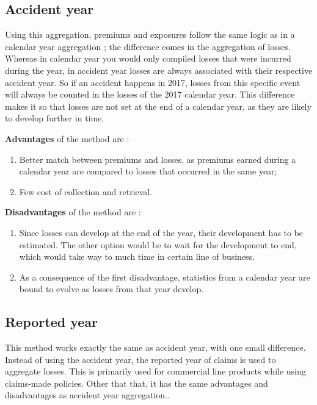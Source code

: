 \documentclass[11pt, english]{memoir}
\numberwithin{definition}{section}
\begin{document}
	\subsection{Accident year}
	Using this aggregation, premiums and exposures follow the same logic as in a calendar year aggregation ; the difference comes in the aggregation of losses. Whereas in calendar year you would only compiled losses that were incurred during the year, in accident year losses are always associated with their respective accident year. So if an accident happens in 2017, losses from this specific event will always be counted in the losses of the 2017 calendar year. This difference makes it so that losses are not set at the end of a calendar year, as they are likely to develop further in time.

	\textbf{Advantages} of the method are :
	\begin{enumerate}
		\item Better match between premiums and losses, as premiums earned during a calendar year are compared to losses that occurred in the same year;
		\item Few cost of collection and retrieval.
	\end{enumerate}

	\textbf{Disadvantages} of the method are : 
	\begin{enumerate}
		\item Since losses can develop at the end of the year, their development has to be estimated. The other option would be to wait for the development to end, which would take way to much time in certain line of business. 
		\item As a consequence of the first disadvantage, statistics from a calendar year are bound to evolve as losses from that year develop. 
	\end{enumerate}



	\subsection{Reported year}
	This method works exactly the same as accident year, with one small difference. Instead of using the accident year, the reported year of claims is used to aggregate losses. This is primarily used for commercial line products while using claims-made policies. Other that that, it has the same advantages and disadvantages as accident year aggregation.. 
\end{document}
